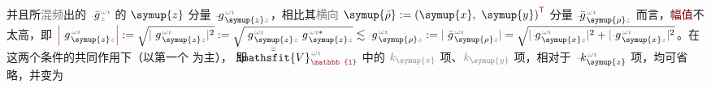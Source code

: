 并且所\textcolor{gray}{混频}出的 $\xint{{}^{}_{\mathcolor{gray}{-}}}{10}{\bar{g}}^{\;\!\mathcolor{gray}{\omega} \textcolor{PineGreen}{\imath}}_{\;\! \mathcolor{gray}{z}}$ 的 $\symup{z}$ 分量 $\xint{{}^{}_{\mathcolor{gray}{-}}}{10}{g}^{\;\!\mathcolor{gray}{\omega} \textcolor{PineGreen}{\imath}}_{\;\! \symup{z} \mathcolor{gray}{z}}$，相比其\textcolor{gray}{横向} $\symup{\bar{\rho}} := \left( \symup{x},~ \symup{y} \right)^{\mathsf{\textcolor{Plum}{T}}}$ 分量 $\xint{{}^{}_{\mathcolor{gray}{-}}}{10}{\bar{g}}^{\;\!\mathcolor{gray}{\omega} \textcolor{PineGreen}{\imath}}_{\;\! \symup{\rho} \mathcolor{gray}{z}}$ 而言，\textcolor{Maroon}{幅值}不太高，即 $\textcolor{Plum}{\left| \textcolor{black}{\xint{{}^{}_{\mathcolor{gray}{-}}}{10}{g}^{\;\!\mathcolor{gray}{\omega} \textcolor{PineGreen}{\imath}}_{\;\! \symup{z} \mathcolor{gray}{z}}} \right|} := \sqrt{ \textcolor{Plum}{\lvert} \xint{{}^{}_{\mathcolor{gray}{-}}}{10}{g}^{\;\!\mathcolor{gray}{\omega} \textcolor{PineGreen}{\imath}}_{\;\! \symup{z} \mathcolor{gray}{z}} \textcolor{Plum}{\rvert}^2 } := \sqrt{ \xint{{}^{}_{\mathcolor{gray}{-}}}{10}{g}^{\;\!\mathcolor{gray}{\omega} \textcolor{PineGreen}{\imath}}_{\;\! \symup{z} \mathcolor{gray}{z}} \xint{{}^{}_{\mathcolor{gray}{-}}}{10}{g}^{\;\!\mathcolor{gray}{\omega} \textcolor{PineGreen}{\imath} *}_{\;\! \symup{z} \mathcolor{gray}{z}} } \lesssim \xint{{}^{}_{\mathcolor{gray}{-}}}{10}{g}^{\;\!\mathcolor{gray}{\omega} \textcolor{PineGreen}{\imath}}_{\;\! \symup{\rho} \mathcolor{gray}{z}} := \textcolor{Plum}{\lvert} \xint{{}^{}_{\mathcolor{gray}{-}}}{10}{\bar{g}}^{\;\!\mathcolor{gray}{\omega} \textcolor{PineGreen}{\imath}}_{\;\! \symup{\rho} \mathcolor{gray}{z}} \textcolor{Plum}{\rvert} = \sqrt{ \textcolor{Plum}{\lvert} \xint{{}^{}_{\mathcolor{gray}{-}}}{10}{g}^{\;\! \mathcolor{gray}{\omega} \textcolor{PineGreen}{\imath}}_{\;\! \symup{x} \mathcolor{gray}{z}} \textcolor{Plum}{\rvert}^2 + \textcolor{Plum}{\lvert} \xint{{}^{}_{\mathcolor{gray}{-}}}{10}{g}^{\;\! \mathcolor{gray}{\omega} \textcolor{PineGreen}{\imath}}_{\;\! \symup{x} \mathcolor{gray}{z}} \textcolor{Plum}{\rvert}^2 }$。在这两个条件的共同作用下（以第一个  为主）， 即 $\xint{\mathcolor{gray}{-}}{25}{\bar{\bar{\mathsfit{V}}}}^{\;\! \mathcolor{gray}{\omega} \textcolor{PineGreen}{\imath}}_{\textcolor{Maroon}{\mathbb{1}}}$ 中的 $\mathcolor{gray}{k_{\symup{x}}}$ 项、$\mathcolor{gray}{k_{\symup{y}}}$ 项，相对于 $\xint{\begin{smallmatrix} ~ \\ {}^{}_{\mathcolor{gray}{-}} \\ ~ \end{smallmatrix}}{15}{k}_{\symup{z}}^{\;\! \mathcolor{gray}{\omega} \textcolor{PineGreen}{\imath}}$ 项，均可省略，并变为
